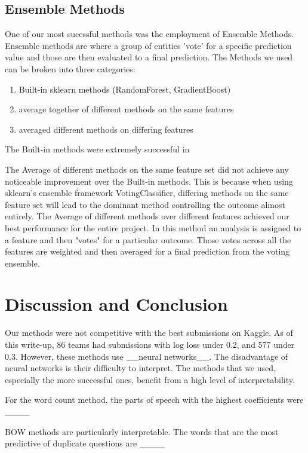 \documentclass{article} %
\begin{document}
\subsection{Ensemble Methods}
One of our most sucessful methods was the employment of Ensemble Methods. Ensemble methods are where a group of entities 'vote' for a specific prediction value and those are then evaluated to a final prediction. The Methods we used can be broken into three categories:
\begin{enumerate}
	\item Built-in sklearn methods (RandomForest, GradientBoost)
	\item average together of different methods on the same features
	\item averaged different methods on differing features
\end{enumerate}
The Built-in methods were extremely successful in 

The Average of different methods on the same feature set did not achieve any noticeable improvement over the Built-in methods. This is because when using sklearn's ensemble framework VotingClassifier, differing methods on the same feature set will lead to the dominant method controlling the outcome almost entirely.
The Average of different methods over different features achieved our best performance for the entire project. In this method an analysis is assigned to a feature and then "votes" for a particular outcome. Those votes across all the features are weighted and then averaged for a final prediction from the voting ensemble.


\section{Discussion and Conclusion}

Our methods were not competitive with the best submissions on Kaggle. As of this write-up, 86 teams had submissions with log loss under 0.2, and 577 under 0.3. However, these methods use \_\_neural networks\_\_. The disadvantage of neural networks is their difficulty to interpret. The methods that we used, especially the more successful ones, benefit from a high level of interpretability. 

For the word count method, the parts of speech with the highest coefficients were \_\_\_\_

BOW methods are particularly interpretable. The words that are the most predictive of duplicate questions are \_\_\_\_
\end{document}
